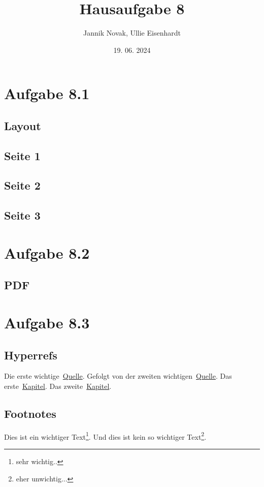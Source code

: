 \documentclass{article}
\title{Hausaufgabe 8}
\author{Jannik Novak, Ullie Eisenhardt}
\date{19. 06. 2024}
\begin{document}
\maketitle

\clearpage

\tableofcontents

\section{Aufgabe 8.1}
\label{sec:intro}

\subsection{Layout}
\layout
\clearpage

\subsection{Seite 1}
\blindtext
\clearpage


\subsection{Seite 2}
\blindtext
\clearpage

\restoregeometry
\subsection{Seite 3}
\blindtext
\clearpage

\section{Aufgabe 8.2}
\label{sec:zwei}

\subsection{PDF}

\clearpage

\section{Aufgabe 8.3}

\subsection{Hyperrefs}
Die erste wichtige~\href{https://www.youtube.com/watch?v=dQw4w9WgXcQ}{Quelle}. Gefolgt von der zweiten wichtigen~\href{https://www.youtube.com/watch?v=cPJUBQd-PNM}{Quelle}. Das erste~\hyperref[sec:intro]{Kapitel}. Das zweite~\hyperref[sec:zwei]{Kapitel}.

\subsection{Footnotes}

Dies ist ein wichtiger Text\footnote{sehr wichtig..}. Und dies ist kein so wichtiger Text\footnote{eher unwichtig...}.
\end{document}

